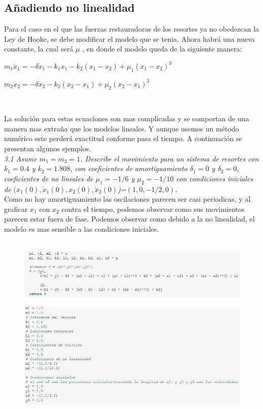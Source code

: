 \documentclass[12pt]{article}
\begin{document}
\subsection{Añadiendo no linealidad}
Para el caso en el que las fuerzas restauradoras de los resortes ya no obedezcan la Ley de Hooke, se debe modificar el modelo que se tenia. Ahora habrá una nueva constante, la cual será $\mu$ , en donde el modelo queda de la siguiente manera: \\

\centerline{$m_1 \ddot x_1 = -\delta \dot x_1 -k_1x_1 - k_2(x_1-x_2) + \mu_1 (x_1-x_2)^3$}
\centerline{$m_2 \ddot x_2 = -\delta \dot x_2 -k_2(x_2-x_1) + \mu_2 (x_2-x_1)^3$}
$    $

La solución para estas ecuaciones son mas complicadas y se comportan de una manera mas extraña que los modelos lineales. Y aunque usemos un método numérico este perderá exactitud conforme pasa el tiempo. A continuación se presentan algunos ejemplos. \\

\noindent \textit{3.1 Asume $m_1 = m_2 = 1$. Describe el movimiento para un sistema de resortes con $k_1=0.4$ y $k_2=1.808$, con coeficientes de amortiguamiento $\delta_1=0$ y $\delta_2=0$, coeficientes de no lineales de $\mu_1=-1/6$ y $\mu_2=-1/10$ con condiciones iniciales de $(x_1(0), \dot x_1(0), x_2(0), \dot x_2(0)$)=$(1,0,-1/2,0)$.}\\

Como no hay amortiguamiento las oscilaciones parecen ser casi periodicas, y al graficar $x_1$ con $x_2$ contra el tiempo, podemos observar como sus movimientos parecen estar fuera de fase. Podemos observar como debido a la no linealidad, el modelo es mas sensible a las condiciones iniciales. \\ \\

\begin{figure}[h!]
    \centering
\includegraphics[width=5in]{Cod8.png}
\end{figure}

\begin{figure}[h!]
    \centering
\includegraphics[width=5in]{Cod9.png}
\end{figure}
\end{document}
